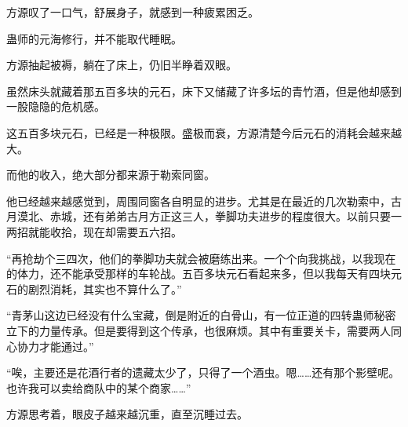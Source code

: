 \begin{this_body}
方源叹了一口气，舒展身子，就感到一种疲累困乏。

蛊师的元海修行，并不能取代睡眠。

方源抽起被褥，躺在了床上，仍旧半睁着双眼。

虽然床头就藏着那五百多块的元石，床下又储藏了许多坛的青竹酒，但是他却感到一股隐隐的危机感。

这五百多块元石，已经是一种极限。盛极而衰，方源清楚今后元石的消耗会越来越大。

而他的收入，绝大部分都来源于勒索同窗。

他已经越来越感觉到，周围同窗各自明显的进步。尤其是在最近的几次勒索中，古月漠北、赤城，还有弟弟古月方正这三人，拳脚功夫进步的程度很大。以前只要一两招就能收拾，现在却需要五六招。

“再抢劫个三四次，他们的拳脚功夫就会被磨练出来。一个个向我挑战，以我现在的体力，还不能承受那样的车轮战。五百多块元石看起来多，但以我每天有四块元石的剧烈消耗，其实也不算什么了。”

“青茅山这边已经没有什么宝藏，倒是附近的白骨山，有一位正道的四转蛊师秘密立下的力量传承。但是要得到这个传承，也很麻烦。其中有重要关卡，需要两人同心协力才能通过。”

“唉，主要还是花酒行者的遗藏太少了，只得了一个酒虫。嗯……还有那个影壁呢。也许我可以卖给商队中的某个商家……”

方源思考着，眼皮子越来越沉重，直至沉睡过去。

\end{this_body}


